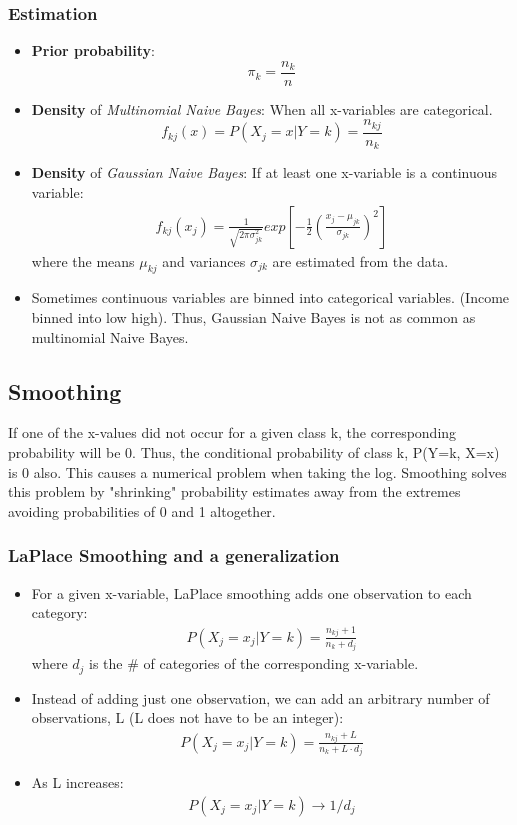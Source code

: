 \documentclass[12pt, oneside]{article}
\begin{document}
\subsubsection{Estimation}
\begin{itemize}
    \item \textbf{Prior probability}: $$\pi_k = \frac{n_k}{n}$$
    \item \textbf{Density} of \emph{Multinomial Naive Bayes}: When all x-variables are categorical.   $$f_{kj}(x) = P(X_j=x|Y=k) = \frac{n_{kj}}{n_k}$$ 
    \item \textbf{Density} of \emph{Gaussian Naive Bayes}: If at least one x-variable is a continuous variable:
    \begin{align*}
        f_{kj}(x_j) = \frac{1}{\sqrt{2\pi\sigma^2_{jk}}}exp\left[-\frac{1}{2}\left(\frac{x_j-\mu_{jk}}{\sigma_{jk}}\right)^2\right]
    \end{align*}
    where the means $\mu_{kj}$ and variances $\sigma_{jk}$ are estimated from the data. 
    \item Sometimes continuous variables are binned into categorical variables. (Income binned into low high). Thus, Gaussian Naive Bayes is not as common as multinomial Naive Bayes.
\end{itemize}

\subsection{Smoothing}
If one of the x-values did not occur for a given class k, the corresponding probability will be 0. Thus, the conditional probability of class k, P(Y=k, X=x) is 0 also. This causes a numerical problem when taking the log. Smoothing solves this problem by "shrinking" probability estimates away from the extremes avoiding probabilities of 0 and 1 altogether.

\subsubsection{LaPlace Smoothing and a generalization}
\begin{itemize}
    \item For a given x-variable, LaPlace smoothing adds one observation to each category:
    \begin{align*}
        P(X_j = x_j |Y=k) = \frac{n_{kj} + 1}{n_k + d_j}
    \end{align*}
    where $d_j$ is the \# of categories of the corresponding x-variable.
    \item Instead of adding just one observation, we can add an arbitrary number of observations, L (L does not have to be an integer):
     \begin{align*}
        P(X_j = x_j |Y=k) = \frac{n_{kj} + L}{n_k + L \cdot d_j}
    \end{align*}
    \item As L increases:
    \begin{align*}
        P(X_j = x_j |Y=k) \rightarrow 1/d_j
    \end{align*}
    
\end{itemize}
\end{document}
